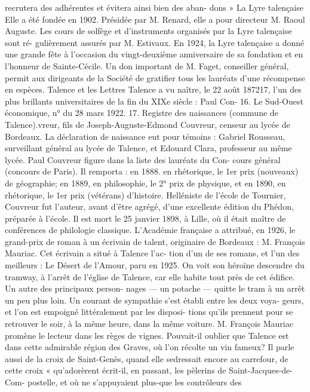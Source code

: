 \documentclass[a4paper,11pt]{book}
\begin{document}
recrutera des adhérentes et évitera ainsi bien des aban-
dons »
La Lyre talençaise
Elle a été fondée en 1902. Présidée par M. Renard, elle
a pour directeur M. Raoul Auguste. Les cours de solfège
et d'instruments organisés par la Lyre talençaise sont ré-
gulièrement assurés par M. Estivaux.
En 1924, la Lyre talençaise a donné une grande fête à
l'occasion du vingt-deuxième anniversaire de sa fondation
et en l'honneur de Sainte-Cécile. Un don important de
M. Faget, conseiller général, permit aux dirigeants de la
Société de gratifier tous les lauréats d'une récompense
en espèces.
Talence et les Lettres
Talence a vu naître, le 22 août 187217, l'un des plus
brillants universitaires de la fin du XIXe siècle : Paul Con-
16. Le Sud-Ouest économique, n° du 28 mars 1922.
17. Registre des naissances (commune de Talence).vreur, fils de Joseph-Auguste-Edmond Couvreur, censeur
au lycée de Bordeaux.
La déclaration de naissance eut pour témoins : Gabriel
Rousseau, surveillant général au lycée de Talence, et
Edouard Clara, professeur au même lycée.
Paul Couvreur figure dans la liste des lauréats du Con-
cours général (concours de Paris). Il remporta : en 1888.
en rhétorique, le 1er prix (nouveaux) de géographie; en
1889, en philosophie, le 2° prix de physique, et en 1890,
en rhétorique, le 1er prix (vétérans) d'histoire.
Helléniste de l'école de Tournier, Couvreur fut l'auteur,
avant d'être agrégé, d'une excellente édition du Phédon,
préparée à l'école. Il est mort le 25 janvier 1898, à Lille,
où il était maître de conférences de philologie classique.
L'Académie française a attribué, en 1926, le grand-prix
de roman à un écrivain de talent, originaire de Bordeaux :
M. François Mauriac. Cet écrivain a situé à Talence l'ac-
tion d'un de ses romans, et l'un des meilleurs : Le Désert de
l'Amour, paru en 1925. On voit son héroïne descendre du
tramway, à l'arrêt de l'église de Talence, car elle habite
tout près de cet édifice. Un autre des principaux person-
nages — un potache — quitte le tram à un arrêt un peu plus
loin.
Un courant de sympathie s'est établi entre les deux voya-
geurs, et l'on est empoigné littéralement par les disposi-
tions qu'ils prennent pour se retrouver le soir, à la même
heure, dans la même voiture.
M. François Mauriac promène le lecteur dans les règes
de vignes. Pouvait-il oublier que Talence est dans cette
admirable région des Graves, où l'on récolte un vin fameux?
Il parle aussi de la croix de Saint-Genès, quand elle sedressait encore au carrefour, de cette croix « qu'adorèrent
écrit-il, en passant, les pèlerins de Saint-Jacques-de-Com-
postelle, et où ne s'appuyaient plus-que les contrôleurs des
\end{document}
